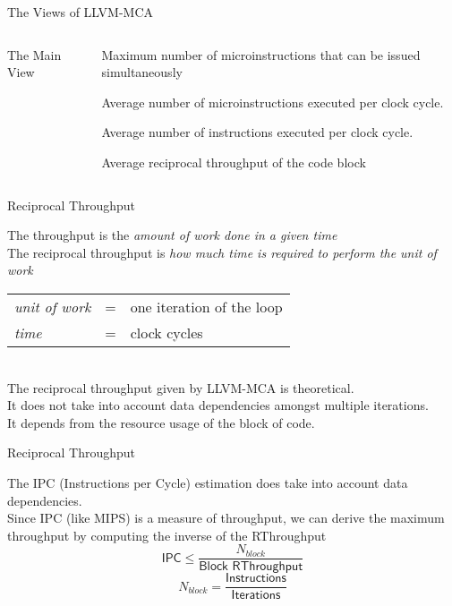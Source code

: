 \begin{frame}{The Views of LLVM-MCA}
\begin{columns}[onlytextwidth]
%
\begin{block}{The Main View}
\end{block}
%
\begin{description}[ABC]
\item[\texttt{Dispatch Width}:] Maximum number of microinstructions that can be issued simultaneously
\item[\texttt{uOps Per Cycle}:] Average number of microinstructions executed per clock cycle.
\item[\texttt{IPC}:] Average number of instructions executed per clock cycle.
\item[\texttt{Block RThroughput}:] Average \alert{reciprocal throughput} of the code block
\end{description}
%
\end{columns}
%
\end{frame}


\begin{frame}{Reciprocal Throughput}
\begin{center}
The \alert{throughput} is the \emph{amount of work done in a given time}\\
\medskip
The \alert{reciprocal throughput} is \emph{how much time is required to perform the unit of work}\\
%
\bigskip
\begin{tabular}{>{\raggedleft}p{} c p{}}
\emph{unit of work} & = & one iteration of the loop\\
\emph{time} & = & clock cycles \\
\end{tabular}\\
\bigskip
%
The reciprocal throughput given by LLVM-MCA is \alert{theoretical}.\\
It does not take into account data dependencies amongst multiple iterations.\\
\medskip
It depends from the resource usage of the block of code.
\end{center}
\end{frame}


\begin{frame}{Reciprocal Throughput}
\begin{center}
The IPC (Instructions per Cycle) estimation \alert{does} take into account data dependencies.\\
\bigskip
Since IPC (like MIPS) is a measure of \alert{throughput}, we can derive the \alert{maximum throughput} by computing the \alert{inverse of the RThroughput}\\
\bigskip
\[
\textsf{IPC} \le \frac{N_{block}}{\textsf{Block RThroughput}}
\]
\[
N_{block} = \frac{\textsf{Instructions}}{\textsf{Iterations}}
\]
\end{center}
\end{frame}


